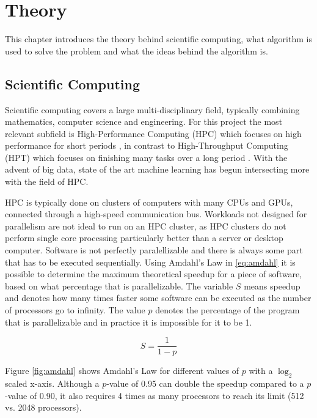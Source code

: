 \chapter{Theory}

This chapter introduces the theory behind scientific computing, what algorithm is used to solve the problem and what the ideas behind the algorithm is.

\section{Scientific Computing}

Scientific computing covers a large multi-disciplinary field, typically combining mathematics, computer science and engineering. For this project the most relevant subfield is High-Performance Computing (HPC) which focuses on high performance for short periods \cite{larsen:hpc}, in contrast to High-Throughput Computing (HPT) which focuses on finishing many tasks over a long period \cite{wisc:htcondor}. With the advent of big data, state of the art machine learning has begun intersecting more with the field of HPC.

HPC is typically done on clusters of computers with many CPUs and GPUs, connected through a high-speed communication bus. Workloads not designed for parallelism are not ideal to run on an HPC cluster, as HPC clusters do not perform single core processing particularly better than a server or desktop computer. Software is not perfectly paralellizable and there is always some part that has to be executed sequentially. Using Amdahl's Law \cite{larsen:hpc} in \eqref{eq:amdahl} it is possible to determine the maximum theoretical speedup for a piece of software, based on what percentage that is parallelizable. The variable $S$ means speedup and denotes how many times faster some software can be executed as the number of processors go to infinity. The value $p$ denotes the percentage of the program that is parallelizable and in practice it is impossible for it to be 1.

\begin{equation} \label{eq:amdahl}
    S = \frac{1}{1 - p}
\end{equation}

Figure \ref{fig:amdahl} shows Amdahl's Law for different values of $p$ with a $\log_2$ scaled x-axis. Although a $p$-value of 0.95 can double the speedup compared to a $p$-value of 0.90, it also requires 4 times as many processors to reach its limit (512 vs. 2048 processors).

